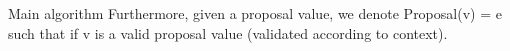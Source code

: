 \documentclass[10pt,a4paper]{article}
\begin{document}
\begin{section}{Main algorithm}
Furthermore, given a proposal value, we denote Proposal(v) = e such that if v is a valid proposal value
(validated according to context).












\end{section}
\end{document}
